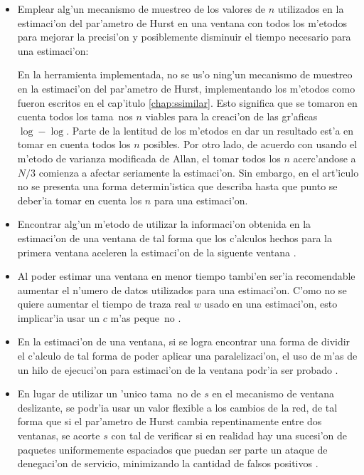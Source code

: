 \begin{itemize}
\item Emplear alg'un mecanismo de muestreo de los valores de $n$ utilizados
en la estimaci'on del par'ametro de Hurst en una ventana con todos los m'etodos
para mejorar la precisi'on y posiblemente disminuir el tiempo necesario para
una estimaci'on:

En la herramienta implementada, no se us'o ning'un mecanismo de muestreo en
la estimaci'on del par'ametro de Hurst, implementando los m'etodos como fueron
escritos en el cap'itulo \ref{chap:ssimilar}. Esto significa que se tomaron en
cuenta todos los tama~nos $n$ viables para la creaci'on de las gr'aficas
$\log - \log$. Parte de la lentitud de los m'etodos en dar un resultado est'a
en tomar en cuenta todos los $n$ posibles.
Por otro lado, de acuerdo con \cite{MAVARStefano} usando el m'etodo de varianza
modificada de Allan, el tomar todos los $n$ acerc'andose a $N/3$ comienza a
afectar seriamente la estimaci'on. Sin embargo, en el art'iculo no se presenta
una forma determin'istica que describa hasta que punto se deber'ia tomar en
cuenta los $n$ para una estimaci'on. 
\item Encontrar alg'un m'etodo de utilizar la informaci'on obtenida en la 
estimaci'on de una ventana de tal forma que los c'alculos hechos para la
primera ventana aceleren la estimaci'on de la siguente ventana
\cite{intelligentfuzzy}.
\item Al poder estimar una ventana en menor tiempo tambi'en ser'ia recomendable
aumentar el n'umero de datos utilizados para una estimaci'on. C'omo no se quiere
aumentar el tiempo de traza real $w$ usado en una estimaci'on, esto implicar'ia
usar un $c$ m'as peque~no \cite{hagiwara00highspeed}.
\item En la estimaci'on de una ventana, si se logra encontrar una forma de
dividir el c'alculo de tal forma de poder aplicar una paralelizaci'on, el uso
de m'as de un hilo de ejecuci'on para estimaci'on de la ventana podr'ia ser
probado \cite{hagiwara00highspeed}.
\item En lugar de utilizar un 'unico tama~no de $s$ en el mecanismo de ventana
deslizante, se podr'ia usar un valor flexible a los cambios de la red, de tal
forma que si el par'ametro de Hurst cambia repentinamente entre dos ventanas, se
acorte $s$ con tal de verificar si en realidad hay una sucesi'on de paquetes
uniformemente espaciados que puedan ser parte un ataque de denegaci'on de
servicio, minimizando la cantidad de falsos positivos \cite{intelligentfuzzy}.
\end{itemize}
